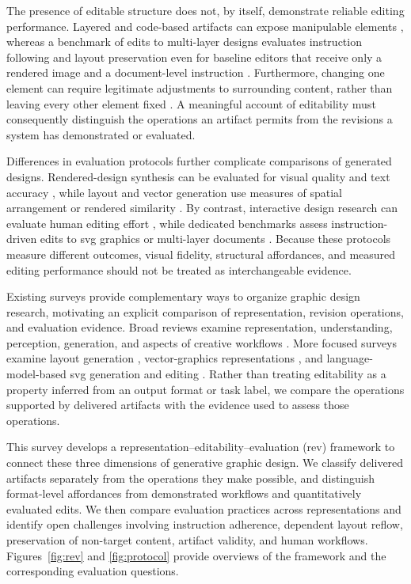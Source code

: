 The presence of editable structure does not, by itself, demonstrate reliable editing performance.
Layered and code-based artifacts can expose manipulable elements \citep{cole2023,editablevisual2026}, whereas a benchmark of edits to multi-layer designs evaluates instruction following and layout preservation even for baseline editors that receive only a rendered image and a document-level instruction \citep{mildedit2026}.
Furthermore, changing one element can require legitimate adjustments to surrounding content, rather than leaving every other element fixed \citep{yang2026infoedit}.
A meaningful account of editability must consequently distinguish the operations an artifact permits from the revisions a system has demonstrated or evaluated.

Differences in evaluation protocols further complicate comparisons of generated designs.
Rendered-design synthesis can be evaluated for visual quality and text accuracy \citep{designdiffusion2025,postermaker2025}, while layout and vector generation use measures of spatial arrangement or rendered similarity \citep{layoutdm2023,vectorfusion2023}.
By contrast, interactive design research can evaluate human editing effort \citep{vinci2021}, while dedicated benchmarks assess instruction-driven edits to \ac{svg} graphics \citep{svgeditbench2024,vectorgym2026} or multi-layer documents \citep{mildedit2026}.
Because these protocols measure different outcomes, visual fidelity, structural affordances, and measured editing performance should not be treated as interchangeable evidence.

Existing surveys provide complementary ways to organize graphic design research, motivating an explicit comparison of representation, revision operations, and evaluation evidence.
Broad reviews examine representation, understanding, perception, generation, and aspects of creative workflows \citep{huang2023survey,zou2025fragment}.
More focused surveys examine layout generation \citep{shi2023layoutsurvey}, vector-graphics representations \citep{tian2024vectorsurvey}, and language-model-based \ac{svg} generation and editing \citep{malashenko2025svgreview}.
Rather than treating editability as a property inferred from an output format or task label, we compare the operations supported by delivered artifacts with the evidence used to assess those operations.

This survey develops a representation--editability--evaluation (\ac{rev}) framework to connect these three dimensions of generative graphic design.
We classify delivered artifacts separately from the operations they make possible, and distinguish format-level affordances from demonstrated workflows and quantitatively evaluated edits.
We then compare evaluation practices across representations and identify open challenges involving instruction adherence, dependent layout reflow, preservation of non-target content, artifact validity, and human workflows.
Figures~\ref{fig:rev} and \ref{fig:protocol} provide overviews of the framework and the corresponding evaluation questions.
